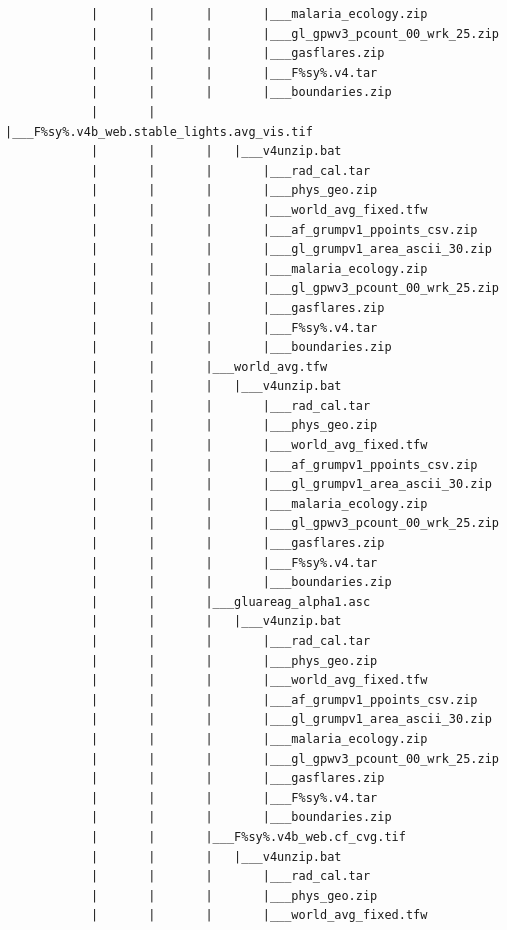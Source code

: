\documentclass[
]{book}
\begin{document}
\begin{verbatim}
            |       |       |       |___malaria_ecology.zip
            |       |       |       |___gl_gpwv3_pcount_00_wrk_25.zip
            |       |       |       |___gasflares.zip
            |       |       |       |___F%sy%.v4.tar
            |       |       |       |___boundaries.zip
            |       |       |___F%sy%.v4b_web.stable_lights.avg_vis.tif
            |       |       |   |___v4unzip.bat
            |       |       |       |___rad_cal.tar
            |       |       |       |___phys_geo.zip
            |       |       |       |___world_avg_fixed.tfw
            |       |       |       |___af_grumpv1_ppoints_csv.zip
            |       |       |       |___gl_grumpv1_area_ascii_30.zip
            |       |       |       |___malaria_ecology.zip
            |       |       |       |___gl_gpwv3_pcount_00_wrk_25.zip
            |       |       |       |___gasflares.zip
            |       |       |       |___F%sy%.v4.tar
            |       |       |       |___boundaries.zip
            |       |       |___world_avg.tfw
            |       |       |   |___v4unzip.bat
            |       |       |       |___rad_cal.tar
            |       |       |       |___phys_geo.zip
            |       |       |       |___world_avg_fixed.tfw
            |       |       |       |___af_grumpv1_ppoints_csv.zip
            |       |       |       |___gl_grumpv1_area_ascii_30.zip
            |       |       |       |___malaria_ecology.zip
            |       |       |       |___gl_gpwv3_pcount_00_wrk_25.zip
            |       |       |       |___gasflares.zip
            |       |       |       |___F%sy%.v4.tar
            |       |       |       |___boundaries.zip
            |       |       |___gluareag_alpha1.asc
            |       |       |   |___v4unzip.bat
            |       |       |       |___rad_cal.tar
            |       |       |       |___phys_geo.zip
            |       |       |       |___world_avg_fixed.tfw
            |       |       |       |___af_grumpv1_ppoints_csv.zip
            |       |       |       |___gl_grumpv1_area_ascii_30.zip
            |       |       |       |___malaria_ecology.zip
            |       |       |       |___gl_gpwv3_pcount_00_wrk_25.zip
            |       |       |       |___gasflares.zip
            |       |       |       |___F%sy%.v4.tar
            |       |       |       |___boundaries.zip
            |       |       |___F%sy%.v4b_web.cf_cvg.tif
            |       |       |   |___v4unzip.bat
            |       |       |       |___rad_cal.tar
            |       |       |       |___phys_geo.zip
            |       |       |       |___world_avg_fixed.tfw

\end{verbatim}
\end{document}
